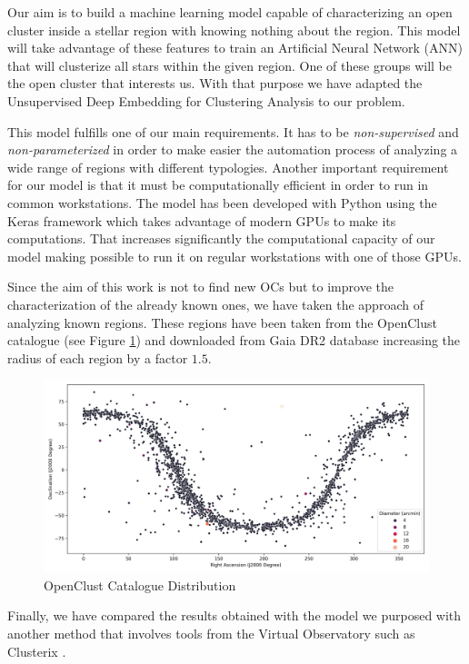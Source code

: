 \documentclass[11pt,a4paper,USenglish,twocolumn]{article}
\begin{document}
Our aim is to build a machine learning model capable of characterizing an open
cluster inside a stellar region with knowing nothing about the region.
This model will take advantage of these features to train an Artificial Neural
Network (ANN) that will clusterize all stars within the given region.
One of these groups will be the open cluster that interests us.
With that purpose we have adapted the Unsupervised Deep Embedding for Clustering
Analysis \cite{xie2016unsupervised} to our problem.

This model fulfills one of our main requirements.
It has to be \emph{non-supervised} and \emph{non-parameterized} in order to make easier
the automation process of analyzing a wide range of regions with different typologies.
Another important requirement for our model is that it must be computationally efficient
in order to run in common workstations.
The model has been developed with Python using the Keras framework which takes
advantage of modern GPUs to make its computations.
That increases significantly the computational capacity of our model making possible
to run it on regular workstations with one of those GPUs.

Since the aim of this work is not to find new OCs but to improve the characterization
of the already known ones, we have taken the approach of analyzing known regions.
These regions have been taken from the OpenClust catalogue \cite{dias2002new}
(see Figure \ref{fig:openclust_catalogue}) and downloaded from Gaia DR2 database
increasing the radius of each region by a factor $1.5$.

\begin{figure}
    \includegraphics[width=\columnwidth]{../figures/openclust_catalogue.png}
    \caption{OpenClust Catalogue Distribution}
    \label{fig:openclust_catalogue}
\end{figure}

Finally, we have compared the results obtained with the model we purposed with another
method that involves tools from the Virtual Observatory such as Clusterix \cite{balaguer2020clusterix}.
\end{document}

